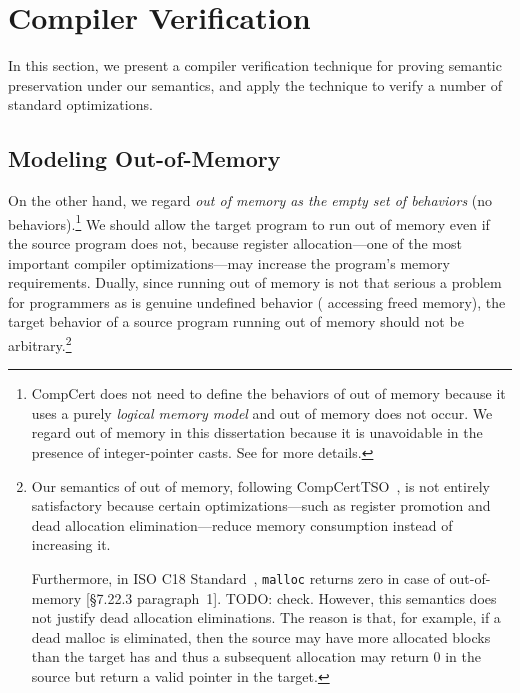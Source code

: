 \section{Compiler Verification}
\label{sec:intptrcast:compiler-verification}

In this section, we present a compiler verification technique for proving semantic preservation
under our semantics, and apply the technique to verify a number of standard optimizations.


\subsection{Modeling Out-of-Memory}
\label{sec:intptrcast:compiler-verification:oom}


On the other hand, we regard \emph{out of memory as the empty set of behaviors} (\ie no
behaviors).\footnote{CompCert does not need to define the behaviors of out of memory because it uses
  a purely \emph{logical memory model} and out of memory does not occur.  We regard out of memory in
  this dissertation because it is unavoidable in the presence of integer-pointer casts.  See
   for more details.}  We should allow the target program to run out of memory
even if the source program does not, because register allocation---one of the most important
compiler optimizations---may increase the program's memory requirements.  Dually, since running out
of memory is not that serious a problem for programmers as is genuine undefined behavior (\eg
accessing freed memory), the target behavior of a source program running out of memory should not be
arbitrary.\footnote{Our semantics of out of memory, following
  CompCertTSO~\cite{vsevvcik2013compcerttso}, is not entirely satisfactory because certain
  optimizations---such as register promotion and dead allocation elimination---reduce memory
  consumption instead of increasing it.

  Furthermore, in ISO C18 Standard~\cite{iso2018iec}, \texttt{malloc} returns zero in case of
  out-of-memory [\S7.22.3 paragraph~1].  TODO: check.  However, this semantics does not justify dead
  allocation eliminations.  The reason is that, for example, if a dead malloc is eliminated, then
  the source may have more allocated blocks than the target has and thus a subsequent allocation may
  return 0 in the source but return a valid pointer in the target.}

